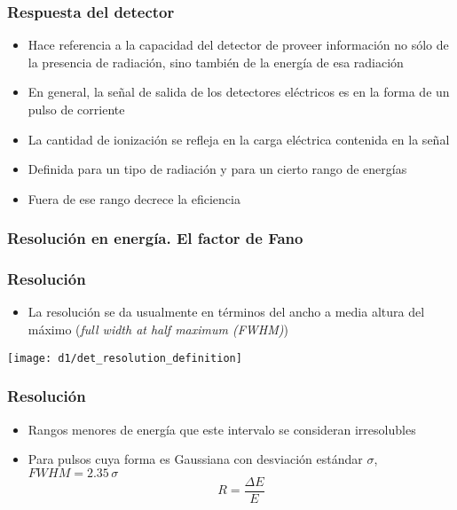 \documentclass{beamer}
\begin{document}
\begin{frame}
\frametitle{Respuesta del detector}
\begin{exampleblock}{}
\begin{itemize}
\item Hace referencia a la capacidad del detector de proveer información no sólo
de la presencia de radiación, sino también de la energía de esa radiación 
\item En general, la señal de salida de los detectores eléctricos es en la forma
de un pulso de corriente 
\item La cantidad de ionización se refleja en la carga eléctrica contenida en la
señal
\end{itemize}
\end{exampleblock}
\begin{alertblock}{}
\begin{itemize}
\item Definida para un tipo de radiación y para un cierto rango de
energías 
\item Fuera de ese rango decrece la eficiencia
\end{itemize}
\end{alertblock}
\end{frame} 

\subsubsection{Resolución en energía. El factor de Fano}

\begin{frame}
\frametitle{Resolución}
\begin{alertblock}{}
\begin{itemize}
\item La resolución se da usualmente en términos del \alert{ancho a media altura del
máximo (\textit{full width at half maximum (FWHM)}}) 
\end{itemize}
\end{alertblock}
\begin{center}
\texttt{[image: d1/det\_resolution\_definition]}
\end{center}
\end{frame} 

\begin{frame}
\frametitle{Resolución}
\begin{alertblock}{}
\begin{itemize}[<+->]
\item Rangos menores de energía que este intervalo se consideran irresolubles 
\item Para pulsos cuya forma es Gaussiana con desviación estándar $\sigma$, $FWHM = 2.35\,\sigma$
$$R = \frac{\Delta E}{E}$$
\end{itemize}
\end{alertblock}
\begin{center}
\end{center}
\end{frame} 
\end{document}
